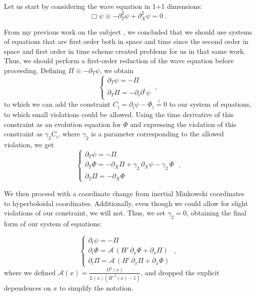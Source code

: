 Let us start by considering the wave equation in 1+1 dimensions:
%
\begin{equation}
    \Box \psi \equiv - \partial_T^2 \psi + \partial_X^2  \psi = 0 \;.
\end{equation}

From my previous work on the subject \cite{}, we concluded that we should use systems of equations that are first order both in space and time since the second order in space and first order in time scheme created problems for us in that same work. Thus, we should perform a first-order reduction of the wave equation before proceeding. Defining $\Pi \equiv -\partial_T \psi$, we obtain
%
\begin{equation}
    \left\{ \begin{array}{l} 
        \partial_T \psi = - \Pi \\ 
        \partial_T \Pi = -\partial_{\underline{i}} \partial^{\underline{i}} \psi 
    \end{array} \right. \; ,
\end{equation}
%
to which we can add the constraint $C_{\underline{i}} = \partial_{\underline{i}} \psi - \Phi_{\underline{i}} \overset{!}{=} 0$ to our system of equations, to which small violations could be allowed. Using the time derivative of this constraint as an evolution equation for $\Phi$ and expressing the violation of this constraint as $\gamma_2 C_{\underline{i}}$, where $\gamma_2$ is a parameter corresponding to the allowed violation, we get
%
\begin{equation}
    \left\{ \begin{array}{l} 
        \partial_T \psi = - \Pi \\ 
        \partial_T \Phi = - \partial_X \Pi + \gamma_2 \, \partial_X \psi - \gamma_2 \, \Phi\\
        \partial_T \Pi = -\partial_X \Phi
    \end{array} \right. \; .
\end{equation}

We then proceed with a coordinate change from inertial Minkowski coordinates to hyperboloidal coordinates. Additionally, even though we could allow for slight violations of our constraint, we will not. Thus, we set $\gamma_2 = 0$, obtaining the final form of our system of equations:

\begin{equation}
    \left\{ \begin{array}{l} 
        \partial_t \psi = - \Pi \\ 
        \partial_t \Phi = \mathcal{A} \, \left( H' \, \partial_x \Phi + \partial_x \Pi \right)\\
        \partial_t \Pi = \mathcal{A} \, \left( H' \, \partial_x \Pi + \partial_x \Phi \right)
    \end{array} \right. \; ,
\end{equation}
where we defined $\mathcal{A}(x) =\frac{\Omega^2(x)}{L(x)(H'^{\,2}(x)-1)}$, and dropped the explicit dependences on $x$ to simplify the notation.

